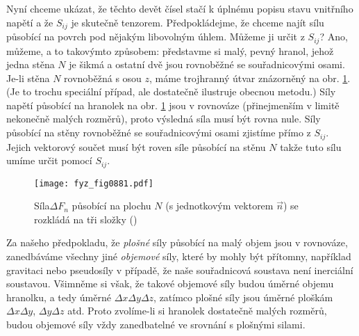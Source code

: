 {    Nyní chceme ukázat, že těchto devět čísel stačí k úplnému popisu stavu vnitřního napětí a že
    \(S_{ij}\) je skutečně tenzorem. Předpokládejme, že chceme najít sílu působící na povrch pod
    nějakým libovolným úhlem. Můžeme ji určit z \(S_{ij}\)? Ano, můžeme, a to takovýmto způsobem:
    představme si malý, pevný hranol, jehož jedna stěna \(N\) je šikmá a ostatní dvě jsou rovnoběžné
    se souřadnicovými osami. Je-li stěna \(N\) rovnoběžná s osou \(z\), máme trojhranný útvar
    znázorněný na obr. \ref{fyz:fig0881}. (Je to trochu speciální případ, ale dostatečně ilustruje
    obecnou metodu.) Síly napětí působící na hranolek na obr. \ref{fyz:fig0881} jsou v rovnováze
    (přinejmenším v limitě nekonečně malých rozměrů), proto výsledná síla musí být rovna nule. Síly
    působící na stěny rovnoběžné se souřadnicovými osami zjistíme přímo z \(S_{ij}\). Jejich
    vektorový součet musí být roven síle působící na stěnu \(N\) takže tuto sílu umíme určit pomocí
    \(S_{ij}\).

    \begin{figure}[ht!] %
      \centering
      \texttt{[image: fyz\_fig0881.pdf]}
      \caption{Síla\(\Delta F_n\) působící na plochu \(N\) (s jednotkovým vektorem \(\vec{n}\)) se
               rozkládá na tři složky (\cite[s.~585]{Feynman02})}
      \label{fyz:fig0881}
    \end{figure}

    Za našeho předpokladu, že \emph{plošné} síly působící na malý objem jsou v rovnováze,
    zanedbáváme všechny jiné \emph{objemové} síly, které by mohly být přítomny, například gravitaci
    nebo pseudosíly v případě, že naše souřadnicová soustava není inerciální soustavou. Všimněme si
    však, že takové objemové síly budou úměrné objemu hranolku, a tedy úměrné \(ΔxΔyΔz\), zatímco
    plošné síly jsou úměrné ploškám \(ΔxΔy\), \(ΔyΔz\) atd. Proto zvolíme-li si hranolek dostatečně
    malých rozměrů, budou objemové síly vždy zanedbatelné ve srovnání s plošnými silami.
    
}
